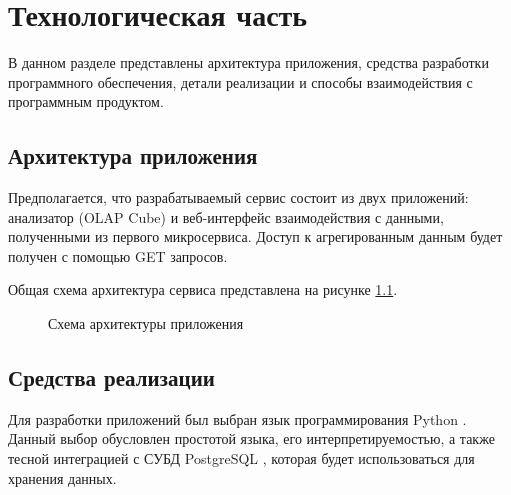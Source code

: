 \chapter{Технологическая часть}

В данном разделе представлены архитектура приложения, средства разработки программного обеспечения, детали реализации и способы взаимодействия с программным продуктом.

\section{Архитектура приложения}

Предполагается, что разрабатываемый сервис состоит из двух приложений: анализатор (OLAP Cube) и веб-интерфейс взаимодействия с данными, полученными из первого микросервиса. Доступ к агрегированным данным будет получен с помощью GET запросов.

Общая схема архитектура сервиса представлена на рисунке \ref{fig:arch}.

\begin{figure}[!h]
	\caption{Схема архитектуры приложения}
	\label{fig:arch}
\end{figure}

\section{Средства реализации}

Для разработки приложений был выбран язык программирования Python \cite{python}. Данный выбор
обусловлен простотой языка, его интерпретируемостью, а также тесной интеграцией с СУБД PostgreSQL \cite{python}, которая будет использоваться для хранения данных.

